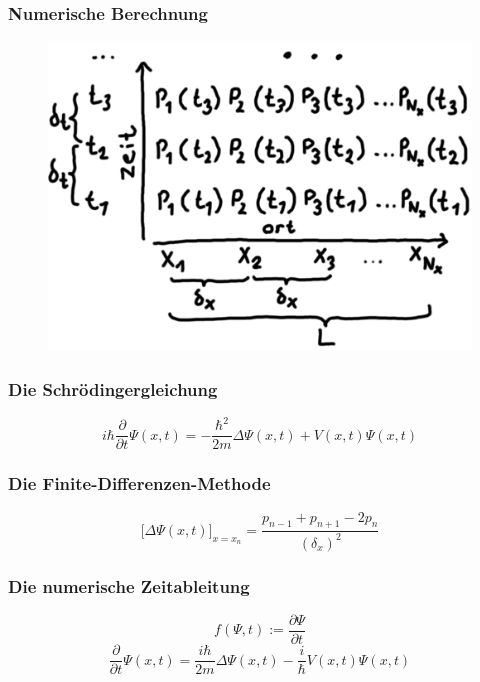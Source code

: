 \documentclass{beamer}
\begin{document}
\begin{frame}
\frametitle{Numerische Berechnung}
\begin{figure}
	\includegraphics[width=0.8\linewidth,height=\textheight,keepaspectratio]{./numerisch5.png}
\end{figure}
\end{frame}
\begin{frame}
\frametitle{Die Schrödingergleichung}
\begin{equation*}
i\hbar\frac{\partial}{\partial t}\Psi(x,t)=- \frac{\hbar^2}{2m}\Delta \Psi(x, t) + V(x, t) \Psi(x, t)
\label{Schroedingergleichnung}
\end{equation*}
\end{frame}
 \begin{frame}
	 \frametitle{Die Finite-Differenzen-Methode}
	 \begin{equation*}
	 	\big[\Delta\Psi(x, t)\big]_{x = x_n}=\frac{p_{n-1} + p_{n + 1} - 2 p_n}{(\delta_x)^2}
	 \end{equation*}

\end{frame}
\begin{frame}
	\frametitle{Die numerische Zeitableitung}
	\begin{equation*}
	f(\Psi, t):=\frac{\partial \Psi}{\partial t}
	\end{equation*}
	\pause
	\begin{equation*}
	\frac{\partial}{\partial t}\Psi(x,t) = \frac{i\hbar}{2m}\Delta \Psi(x, t) - \frac{i}{\hbar} V(x, t) \Psi(x, t)
	\end{equation*}
\end{frame}
\end{document}
